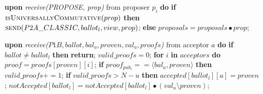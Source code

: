 \begin{algorithm}
\begin{algorithmic}[1]
		\State
		\State \textbf{upon} \textit{receive(PROPOSE, prop)} from proposer $p_i$ \textbf{do} 
		\State \hspace{\algorithmicindent} \textbf{if} $\Call{isUniversallyCommutative}{prop}$ \textbf{then}
		\State \hspace{\algorithmicindent}\hspace{\algorithmicindent} $\Call{send}{P2A\_CLASSIC, ballot_l,view, prop}$;
		\State \hspace{\algorithmicindent} \textbf{else}
		\State \hspace{\algorithmicindent}\hspace{\algorithmicindent} $proposals = proposals \bullet prop$;
		
		\State
		\State \textbf{upon} \textit{receive($P1B, ballot, bal_a, proven,val_a, proofs$)} from acceptor $a$ \textbf{do}
		\State \hspace{\algorithmicindent} \textbf{if} $ballot \neq ballot_l$ \textbf{then}
		\State \hspace{\algorithmicindent}\hspace{\algorithmicindent} \textbf{return};
		\State
		\State \hspace{\algorithmicindent} $valid\_proofs = 0$; 
		\State \hspace{\algorithmicindent} \textbf{for} $i$ \textbf{in} $acceptors$ \textbf{do}
		\State \hspace{\algorithmicindent}\hspace{\algorithmicindent} $proof = proofs[proven][i]$;
		\State \hspace{\algorithmicindent}\hspace{\algorithmicindent} \textbf{if} $proof_{pub_i} == \langle bal_a, proven \rangle$ \textbf{then}
		\State \hspace{\algorithmicindent}\hspace{\algorithmicindent}\hspace{\algorithmicindent} 
		$valid\_proofs \mathrel{+{=}} 1$;
		\State
		\State \hspace{\algorithmicindent} \textbf{if} $valid\_proofs > N-u$ \textbf{then}
		\State \hspace{\algorithmicindent}\hspace{\algorithmicindent} $accepted[ballot_l][a] = proven$;
		\State \hspace{\algorithmicindent}\hspace{\algorithmicindent}	$notAccepted[ballot_l] = notAccepted[ballot_l] \bullet (val_a \setminus proven)$;		
		

\end{algorithmic}
\end{algorithm}
